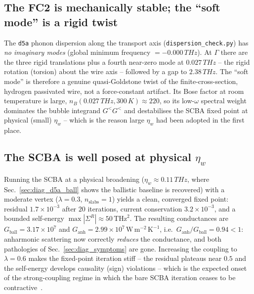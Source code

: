 \subsection{The FC2 is mechanically stable; the ``soft mode'' is a rigid twist}
\label{sec:diag_dispersion}

The \texttt{d5a} phonon dispersion along the transport axis
(\texttt{dispersion\_check.py}) has \emph{no imaginary modes} (global minimum
frequency $=-0.000\,THz$). At $\Gamma$ there are the three rigid translations
plus a fourth near-zero mode at $0.027\,THz$ -- the rigid rotation (torsion)
about the wire axis -- followed by a gap to $2.38\,THz$. The ``soft mode'' is
therefore a genuine quasi-Goldstone twist of the finite-cross-section, hydrogen
passivated wire, not a force-constant artifact. Its Bose factor at room
temperature is large, $n_B(0.027\,THz,300\,K)\approx220$, so its
low-$\omega$ spectral weight dominates the bubble integrand $G^<G^<$ and
destabilises the SCBA fixed point at physical (small) $\eta_w$ -- which is the
reason large $\eta_w$ had been adopted in the first place.

\subsection{The SCBA is well posed at physical \texorpdfstring{$\eta_w$}{eta}}
\label{sec:diag_physical_eta}

Running the SCBA at a physical broadening ($\eta_w\approx0.11\,THz$, where
Sec.~\ref{sec:diag_d5a_ball} shows the ballistic baseline is recovered) with a moderate
vertex ($\lambda=0.3$, $n_\text{slabs}=1$) yields a clean, converged fixed point: residual
$1.7\times10^{-3}$ after $20$ iterations, current conservation $3.2\times10^{-3}$, and a
bounded self-energy $\max|\Sigma^R|\approx50\,\mathrm{THz}^2$. The resulting conductances are
$G_\text{ball}=3.17\times10^{7}$ and $G_\text{anh}=2.99\times10^{7}\,\mathrm{W\,m^{-2}\,K^{-1}}$,
i.e.\ $G_\text{anh}/G_\text{ball}=0.94<1$: anharmonic scattering now correctly \emph{reduces}
the conductance, and both pathologies of Sec.~\ref{sec:diag_symptoms} are gone. Increasing the
coupling to $\lambda=0.6$ makes the fixed-point iteration stiff -- the residual plateaus near
$0.5$ and the self-energy develops causality (sign) violations -- which is the expected onset
of the strong-coupling regime in which the bare SCBA iteration ceases to be
contractive~\cite{lee_anharmonic_2018}.


